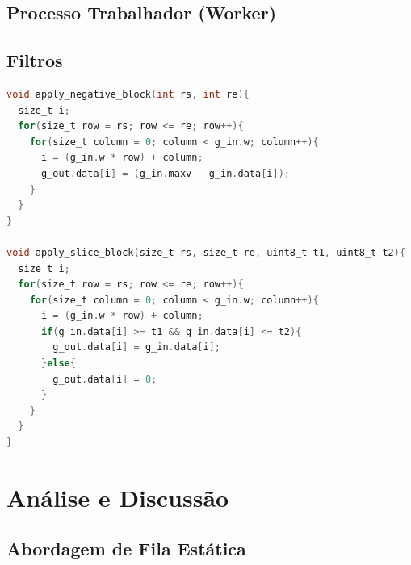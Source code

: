 \documentclass[12 pt]{abntex2}
\begin{document}
\subsection{Processo Trabalhador (Worker)} 

\subsection{Filtros}
 
\begin{lstlisting}[language=C, texcl=true]
void apply_negative_block(int rs, int re){
  size_t i;
  for(size_t row = rs; row <= re; row++){
    for(size_t column = 0; column < g_in.w; column++){
      i = (g_in.w * row) + column;
      g_out.data[i] = (g_in.maxv - g_in.data[i]);
    }
  }
}

void apply_slice_block(size_t rs, size_t re, uint8_t t1, uint8_t t2){
  size_t i;
  for(size_t row = rs; row <= re; row++){
    for(size_t column = 0; column < g_in.w; column++){
      i = (g_in.w * row) + column;
      if(g_in.data[i] >= t1 && g_in.data[i] <= t2){
        g_out.data[i] = g_in.data[i];
      }else{
        g_out.data[i] = 0;
      }
    }
  }
}
\end{lstlisting}




\section{Análise e Discussão}
 
\subsection{Abordagem de Fila Estática}
 
\end{document}
